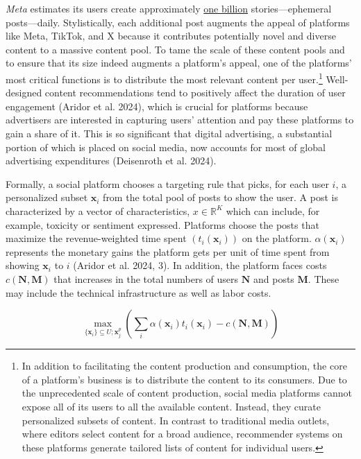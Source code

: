 \documentclass[
  a4paper,
]{scrreprt}
\begin{document}
\emph{Meta} estimates its users create approximately
\href{https://web.archive.org/web/20240531061745/https://www.facebook.com/business/news/stories-can-do-it}{one
billion} stories---ephemeral posts---daily. Stylistically, each
additional post augments the appeal of platforms like Meta, TikTok, and
X because it contributes potentially novel and diverse content to a
massive content pool. To tame the scale of these content pools and to
ensure that its size indeed augments a platform's appeal, one of the
platforms' most critical functions is to distribute the most relevant
content per user.\footnote{In addition to facilitating the content
  production and consumption, the core of a platform's business is to
  distribute the content to its consumers. Due to the unprecedented
  scale of content production, social media platforms cannot expose all
  of its users to all the available content. Instead, they curate
  personalized subsets of content. In contrast to traditional media
  outlets, where editors select content for a broad audience,
  recommender systems on these platforms generate tailored lists of
  content for individual users.} Well-designed content recommendations
tend to positively affect the duration of user engagement (Aridor et al.
2024), which is crucial for platforms because advertisers are interested
in capturing users' attention and pay these platforms to gain a share of
it. This is so significant that digital advertising, a substantial
portion of which is placed on social media, now accounts for most of
global advertising expenditures (Deisenroth et al. 2024).

Formally, a social platform chooses a targeting rule that picks, for
each user \(i\), a personalized subset \(\mathbf{x}_i\) from the total
pool of posts to show the user. A post is characterized by a vector of
characteristics, \(x \in \mathbb{R}^K\) which can include, for example,
toxicity or sentiment expressed. Platforms choose the posts that
maximize the revenue-weighted time spent \((t_i(\mathbf{x}_i))\) on the
platform. \(\alpha(\mathbf{x}_i)\) represents the monetary gains the
platform gets per unit of time spent from showing \(\mathbf{x}_i\) to
\(i\) (Aridor et al. 2024, 3). In addition, the platform faces costs
\(c(\mathbf{N}, \mathbf{M})\) that increases in the total numbers of
users \(\mathbf{N}\) and posts \(\mathbf{M}\). These may include the
technical infrastructure as well as labor costs.

\[
\max_{\{\mathbf{x}_i\} \subseteq U; \mathbf{x}_j^p} \left( \sum_i \alpha(\mathbf{x}_i) t_i(\mathbf{x}_i) - c(\mathbf{N}, \mathbf{M}) \right)
\]
\end{document}
